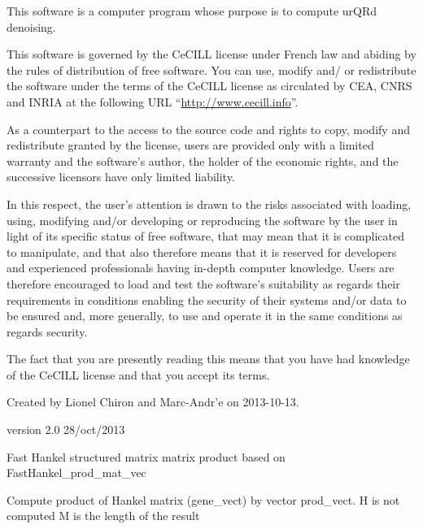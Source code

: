 \documentclass[letterpaper,10pt,openany,oneside]{sphinxmanual}
\begin{document}
This software is a computer program whose purpose is to compute urQRd denoising.

This software is governed by the CeCILL  license under French law and
abiding by the rules of distribution of free software.  You can  use, 
modify and/ or redistribute the software under the terms of the CeCILL
license as circulated by CEA, CNRS and INRIA at the following URL
``\href{http://www.cecill.info}{http://www.cecill.info}''.

As a counterpart to the access to the source code and  rights to copy,
modify and redistribute granted by the license, users are provided only
with a limited warranty  and the software's author,  the holder of the
economic rights,  and the successive licensors  have only  limited
liability.

In this respect, the user's attention is drawn to the risks associated
with loading,  using,  modifying and/or developing or reproducing the
software by the user in light of its specific status of free software,
that may mean  that it is complicated to manipulate,  and  that  also
therefore means  that it is reserved for developers  and  experienced
professionals having in-depth computer knowledge. Users are therefore
encouraged to load and test the software's suitability as regards their
requirements in conditions enabling the security of their systems and/or 
data to be ensured and,  more generally, to use and operate it in the 
same conditions as regards security.

The fact that you are presently reading this means that you have had
knowledge of the CeCILL license and that you accept its terms.

Created by Lionel Chiron and Marc-Andr'e on 2013-10-13.

version 2.0 
28/oct/2013

\begin{fulllineitems}
\label{rst/code:Algo.urQRd.FastHankel_prod_mat_mat}
Fast Hankel structured matrix matrix product based on FastHankel\_prod\_mat\_vec

\end{fulllineitems}


\begin{fulllineitems}
\label{rst/code:Algo.urQRd.FastHankel_prod_mat_vec}
Compute product of Hankel matrix (gene\_vect)  by vector prod\_vect.
H is not computed
M is the length of the result

\end{fulllineitems}
\end{document}
